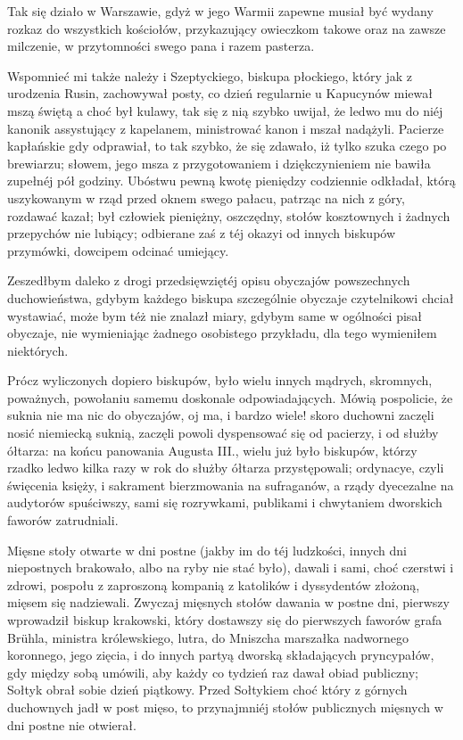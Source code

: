 \documentclass{book}
\begin{document}
Tak się działo w Warszawie, gdyż w jego Warmii zapewne musiał być wydany rozkaz do wszystkich kościołów, przykazujący owieczkom takowe oraz na zawsze milczenie, w przytomności swego pana i razem pasterza.

Wspomnieć mi także należy i Szeptyckiego, biskupa płockiego, który jak z urodzenia Rusin, zachowywał posty, co dzień regularnie u Kapucynów miewał mszą świętą a choć był kulawy, tak się z nią szybko uwijał, że ledwo mu do niéj kanonik assystujący z kapelanem, ministrować kanon i mszał nadążyli. Pacierze kapłańskie gdy odprawiał, to tak szybko, że się zdawało, iż tylko szuka czego po brewiarzu; słowem, jego msza z przygotowaniem i dziękczynieniem nie bawiła zupełnéj pół godziny. Ubóstwu pewną kwotę pieniędzy codziennie odkładał, którą uszykowanym w rząd przed oknem swego pałacu, patrząc na nich z góry, rozdawać kazał; był człowiek pieniężny, oszczędny, stołów kosztownych i żadnych przepychów nie lubiący; odbierane zaś z téj okazyi od innych biskupów przymówki, dowcipem odcinać umiejący.

Zeszedłbym daleko z drogi przedsięwziętéj opisu obyczajów powszechnych duchowieństwa, gdybym każdego biskupa szczególnie obyczaje czytelnikowi chciał wystawiać, może bym téż nie znalazł miary, gdybym same w ogólności pisał obyczaje, nie wymieniając żadnego osobistego przykładu, dla tego wymieniłem niektórych.

Prócz wyliczonych dopiero biskupów, było wielu innych mądrych, skromnych, poważnych, powołaniu samemu doskonale odpowiadających. Mówią pospolicie, że suknia nie ma nic do obyczajów, oj ma, i bardzo wiele! skoro duchowni zaczęli nosić niemiecką suknią, zaczęli powoli dyspensować się od pacierzy, i od służby ółtarza: na końcu panowania Augusta III., wielu już było biskupów, którzy rzadko ledwo kilka razy w rok do służby ółtarza przystępowali; ordynacye, czyli święcenia księży, i sakrament bierzmowania na sufraganów, a rządy dyecezalne na audytorów spuściwszy, sami się rozrywkami, publikami i chwytaniem dworskich faworów zatrudniali.

Mięsne stoły otwarte w dni postne (jakby im do téj ludzkości, innych dni niepostnych brakowało, albo na ryby nie stać było), dawali i sami, choć czerstwi i zdrowi, pospołu z zaproszoną kompanią z katolików i dyssydentów złożoną, mięsem się nadziewali. Zwyczaj mięsnych stołów dawania w postne dni, pierwszy wprowadził biskup krakowski, który dostawszy się do pierwszych faworów grafa Brühla, ministra królewskiego, lutra, do Mniszcha marszałka nadwornego koronnego, jego zięcia, i do innych partyą dworską składających pryncypałów, gdy między sobą umówili, aby każdy co tydzień raz dawał obiad publiczny; Sołtyk obrał sobie dzień piątkowy. Przed Sołtykiem choć który z górnych duchownych jadł w post mięso, to przynajmniéj stołów publicznych mięsnych w dni postne nie otwierał.
\end{document}
